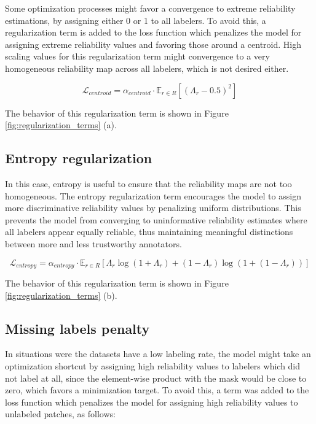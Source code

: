 Some optimization processes might favor a convergence to extreme reliability
estimations, by assigning either 0 or 1 to all labelers. To avoid this, a
regularization term is added to the loss function which penalizes the model
for assigning extreme reliability values and favoring those around a
centroid. High scaling values for this regularization term might
convergence to a very homogeneous reliability map across all
labelers, which is not desired either.

\begin{equation}
  \mathcal{L}_{centroid} = \alpha_{centroid} \cdot
  \mathbb{E}_{r \in R}[(\Lambda_r - 0.5)^2]
\end{equation}

The behavior of this regularization term is shown in Figure
\ref{fig:regularization_terms} (a).

\subsection{Entropy regularization}
In this case, entropy is useful to ensure that the reliability maps
are not too homogeneous. The entropy regularization term encourages
the model to assign more discriminative reliability values by penalizing
uniform distributions. This prevents the model from converging to
uninformative reliability estimates where all labelers appear equally
reliable, thus maintaining meaningful distinctions between more and
less trustworthy annotators.

\begin{equation}
  \mathcal{L}_{entropy} = \alpha_{entropy} \cdot \mathbb{E}_{r \in R}[\Lambda_r
    \log(1 + \Lambda_r)
  +(1 - \Lambda_r) \log(1 + (1 - \Lambda_r))]
\end{equation}

The behavior of this regularization term is shown in Figure
\ref{fig:regularization_terms} (b).

\subsection{Missing labels penalty}
In situations were the datasets have a low labeling rate, the model might
take an optimization shortcut by assigning high reliability values to
labelers which did not label at all, since the element-wise product with the
mask would be close to zero, which favors a minimization target.
To avoid this, a term was added to the loss function which penalizes
the model for assigning high reliability values to unlabeled patches,
as follows:

